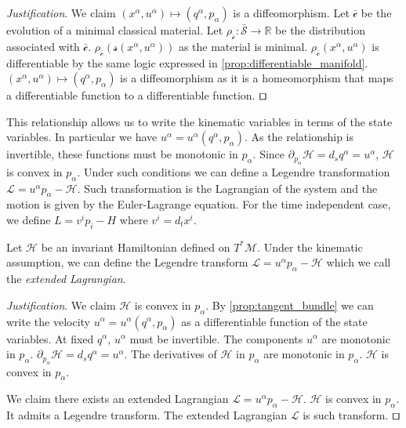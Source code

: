 \documentclass[smallextended]{svjour3}
\numberwithin{equation}{section}
\newenvironment{justification}{\emph{Justification}.}{\hfill\(\qed\)}
\begin{document}
\begin{justification}
	We claim $(x^\alpha, u^\alpha) \mapsto (q^\alpha, p_\alpha)$ is a diffeomorphism. Let $\bar{\mathcal{c}}$ be the evolution of a minimal classical material. Let $\rho_{\bar{\mathcal{c}}} : \bar{\mathcal{S}} \rightarrow \mathbb{R}$ be the distribution associated with $\bar{\mathcal{c}}$. $\rho_{\bar{\mathcal{c}}}(\mathcal{s}(x^\alpha, u^\alpha))$ as the material is minimal. $\rho_{\bar{\mathcal{c}}}(x^\alpha, u^\alpha)$ is differentiable by the same logic expressed in \ref{prop:differentiable_manifold}. $(x^\alpha, u^\alpha) \mapsto (q^\alpha, p_\alpha)$ is a diffeomorphism as it is a homeomorphism that maps a differentiable function to a differentiable function.
\end{justification}

This relationship allows us to write the kinematic variables in terms of the state variables. In particular we have $u^\alpha=u^\alpha(q^\alpha, p_\alpha)$. As the relationship is invertible, these functions must be monotonic in $p_\alpha$. Since $\partial_{p_\alpha} \mathcal{H}=d_s q^\alpha= u^\alpha$, $\mathcal{H}$ is convex in $p_\alpha$. Under such conditions we can define a Legendre transformation $\mathcal{L}=u^\alpha p_\alpha - \mathcal{H}$. Such transformation is the Lagrangian of the system and the motion is given by the Euler-Lagrange equation. For the time independent case, we define $L=v^i p_i - H$ where $v^i=d_t x^i$.

\begin{prop}\label{prop:lagrangian}
	Let $\mathcal{H}$ be an invariant Hamiltonian defined on $T^*\mathcal{M}$. Under the kinematic assumption, we can define the Legendre transform $\mathcal{L}=u^\alpha p_\alpha - \mathcal{H}$ which we call the \emph{extended Lagrangian}.
\end{prop}

\begin{justification}
	We claim $\mathcal{H}$ is convex in $p_\alpha$. By \ref{prop:tangent_bundle} we can write the velocity $u^\alpha=u^\alpha(q^\alpha, p_\alpha)$ as a differentiable function of the state variables. At fixed $q^\alpha$, $u^\alpha$ must be invertible. The components $u^\alpha$ are monotonic in $p_\alpha$. $\partial_{p_\alpha} \mathcal{H}=d_s q^\alpha= u^\alpha$. The derivatives of $\mathcal{H}$ in $p_\alpha$ are monotonic in $p_\alpha$. $\mathcal{H}$ is convex in $p_\alpha$.
	
	We claim there exists an extended Lagrangian $\mathcal{L}=u^\alpha p_\alpha - \mathcal{H}$. $\mathcal{H}$ is convex in $p_\alpha$. It admits a Legendre transform. The extended Lagrangian $\mathcal{L}$ is such transform.
\end{justification}
\end{document}
